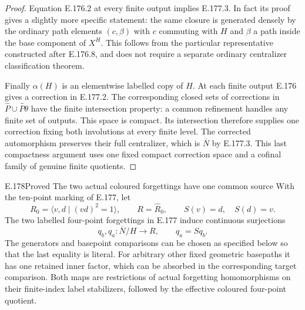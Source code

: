 \begin{proof}
Equation E.176.2 at every finite output implies
E.177.3.  In fact its proof gives a slightly more
specific statement: the same closure is generated
densely by the ordinary path elements \((c,\beta)\)
with \(c\) commuting with \(H\) and \(\beta\) a path
inside the base component of \(X^H\).
This follows from the particular representative
constructed after E.176.8, and does not require a
separate ordinary centralizer classification theorem.

Finally \(\alpha(H)\) is an elementwise labelled
copy of \(H\).  At each finite output E.176 gives
a correction in E.177.2.  The corresponding closed
sets of corrections in
\(\widehat P\cup\widehat P\theta\) have the finite
intersection property: a common refinement handles
any finite set of outputs.  This space is compact.
Its intersection therefore supplies one correction
fixing both involutions at every finite level.
The corrected automorphism preserves their full
centralizer, which is \(\overline N\) by E.177.3.
This last compactness argument uses one fixed compact
correction space and a cofinal family of genuine
finite quotients.
\end{proof}
\begin{result}{E.178}{Proved}
{The two actual coloured forgettings have one common source}
With the ten-point marking of E.177, let
\[
 R_0=\langle v,d\mid(vd)^2=1\rangle,\qquad
 R=\widehat R_0,\qquad S(v)=d,\quad S(d)=v.
\tag{E.178.1}
\]
The two labelled four-point forgettings in E.177 induce
continuous surjections
\[
        q_b,q_a:\overline N/H\longrightarrow R,
                         \qquad q_a=S q_b .
\tag{E.178.2}
\]
The generators and basepoint comparisons can be chosen as
specified below so that the last equality is literal.
For arbitrary other fixed geometric basepaths it has one
retained inner factor, which can be absorbed in the
corresponding target comparison.
Both maps are restrictions of actual forgetting homomorphisms
on their finite-index label stabilizers, followed by the
effective coloured four-point quotient.
\end{result}

